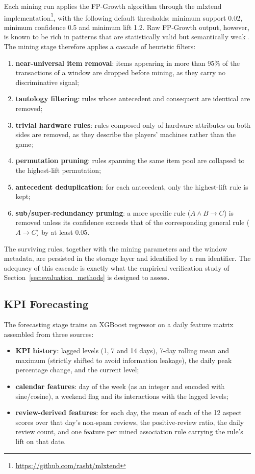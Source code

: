 Each mining run applies the FP-Growth algorithm \cite{han2000fpgrowth} through the mlxtend implementation\footnote{\url{https://github.com/rasbt/mlxtend}}, with the following default thresholds: minimum support 0.02, minimum confidence 0.5 and minimum lift 1.2. Raw FP-Growth output, however, is known to be rich in patterns that are statistically valid but semantically weak \cite{fernandez2022survey_arm_text}. The mining stage therefore applies a cascade of heuristic filters:
\begin{enumerate}
    \item \textbf{near-universal item removal}: items appearing in more than 95\% of the transactions of a window are dropped before mining, as they carry no discriminative signal;
    \item \textbf{tautology filtering}: rules whose antecedent and consequent are identical are removed;
    \item \textbf{trivial hardware rules}: rules composed only of hardware attributes on both sides are removed, as they describe the players' machines rather than the game;
    \item \textbf{permutation pruning}: rules spanning the same item pool are collapsed to the highest-lift permutation;
    \item \textbf{antecedent deduplication}: for each antecedent, only the highest-lift rule is kept;
    \item \textbf{sub/super-redundancy pruning}: a more specific rule ($A \wedge B \rightarrow C$) is removed unless its confidence exceeds that of the corresponding general rule ($A \rightarrow C$) by at least 0.05.
\end{enumerate}
The surviving rules, together with the mining parameters and the window metadata, are persisted in the storage layer and identified by a run identifier. The adequacy of this cascade is exactly what the empirical verification study of Section~\ref{sec:evaluation_methods} is designed to assess.

\subsection{KPI Forecasting}
\label{sec:forecasting}

\noindent The forecasting stage trains an XGBoost regressor \cite{chen2016xgboost} on a daily feature matrix assembled from three sources:
\begin{itemize}
    \item \textbf{KPI history}: lagged levels (1, 7 and 14 days), 7-day rolling mean and maximum (strictly shifted to avoid information leakage), the daily peak percentage change, and the current level;
    \item \textbf{calendar features}: day of the week (as an integer and encoded with sine/cosine), a weekend flag and its interactions with the lagged levels;
    \item \textbf{review-derived features}: for each day, the mean of each of the 12 aspect scores over that day's non-spam reviews, the positive-review ratio, the daily review count, and one feature per mined association rule carrying the rule's lift on that date.
\end{itemize}

